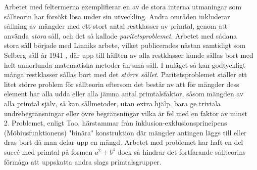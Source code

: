 Arbetet med feltermerna exemplifierar en av de stora interna utmaningar som sållteorin har försökt lösa under sin utveckling.
Andra områden inkluderar sållning av mängder med ett stort antal restklasser av primtal, genom att använda \textit{stora} såll, och det så kallade \textit{paritetsproblemet}. Arbetet med sådana stora såll började med Linniks arbete, vilket publicerades nästan samtidigt som Selberg såll år 1941 \cite[s. 135]{cojocarumurty}, där upp till häflten av alla restklasser kunde sållas bort med helt annorlunda matematiska metoder än små såll. 
I nuläget så kan godtyckligt många restklasser sållas bort med det \textit{större sållet}.
Paritetsproblemet ställer ett litet större problem för sållteorin eftersom det består av att för mängder dess element har alla udda eller alla jämna antal primtalsfaktor, såsom mängden av alla primtal själv, så kan sållmetoder, utan extra hjälp, bara ge triviala undrebegränsningar eller övre begränsningar vilka är fel med en faktor av minst 2.
Problemet, enligt Tao, härstammar från inklusion-exklusionsprincipens (Möbiusfunktionens) "binära" konstruktion där mängder antingen läggs till eller dras bort då man delar upp en mängd.
Arbetet med problemet har haft en del succé med primtal på formen \(a^2 + b^4\) \cite{abPrimes} dock så hindrar det fortfarande sållteorins förmåga att uppskatta andra slags primtalsgrupper.